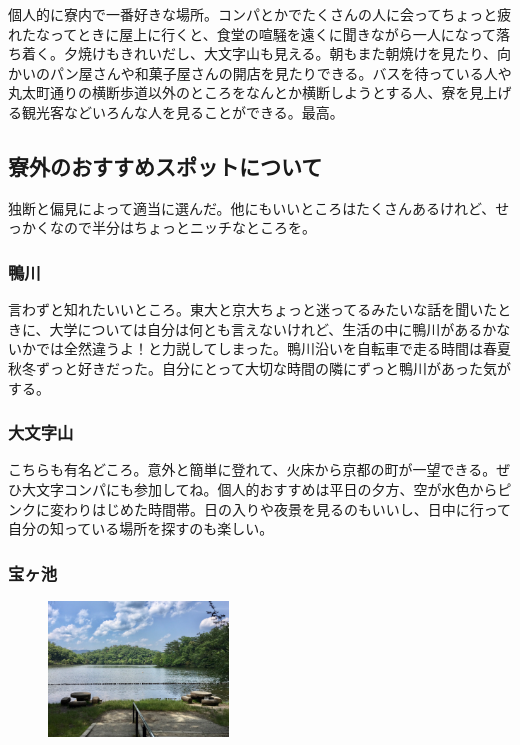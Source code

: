 個人的に寮内で一番好きな場所。コンパとかでたくさんの人に会ってちょっと疲れたなってときに屋上に行くと、食堂の喧騒を遠くに聞きながら一人になって落ち着く。夕焼けもきれいだし、大文字山も見える。朝もまた朝焼けを見たり、向かいのパン屋さんや和菓子屋さんの開店を見たりできる。バスを待っている人や丸太町通りの横断歩道以外のところをなんとか横断しようとする人、寮を見上げる観光客などいろんな人を見ることができる。最高。%

\subsection{寮外のおすすめスポットについて}
独断と偏見によって適当に選んだ。他にもいいところはたくさんあるけれど、せっかくなので半分はちょっとニッチなところを。

\subsubsection{鴨川}
言わずと知れたいいところ。東大と京大ちょっと迷ってるみたいな話を聞いたときに、大学については自分は何とも言えないけれど、生活の中に鴨川があるかないかでは全然違うよ！と力説してしまった。鴨川沿いを自転車で走る時間は春夏秋冬ずっと好きだった。自分にとって大切な時間の隣にずっと鴨川があった気がする。

\subsubsection{大文字山}
こちらも有名どころ。意外と簡単に登れて、火床から京都の町が一望できる。ぜひ大文字コンパにも参加してね。個人的おすすめは平日の夕方、空が水色からピンクに変わりはじめた時間帯。日の入りや夜景を見るのもいいし、日中に行って自分の知っている場所を探すのも楽しい。

\subsubsection{宝ヶ池}
\begin{figure}
  \centering
  \includegraphics[width=4.8cm]{gazo/takaragaike.pdf}
\end{figure}

